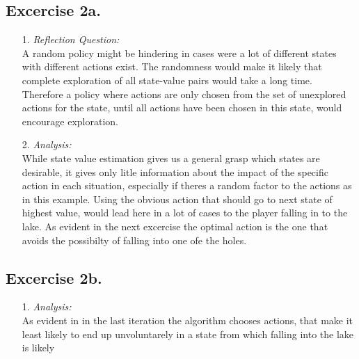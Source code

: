 \documentclass[12pt, a4paper,DIV=12, bibliography=totocnumbered]{scrartcl}
\begin{document}
\subsection{Excercise 2a.}
\begin{itemize}
\item[1.] \textit{Reflection Question:} \\
A random policy might be hindering in cases were a lot of different states with different actions exist. 
The randomness would make it likely that complete exploration of all state-value pairs would take  a long time. 
Therefore a policy where actions are only chosen from the set of unexplored actions for the state, until all actions have been chosen
in this state, would encourage exploration.

\item[2.] \textit{Analysis:} \\
While state value estimation gives us a general grasp which states are desirable, it gives only litle information about the impact of the specific action in each situation, especially if theres a random factor to the actions as in this example.
Using the obvious action that should go to next state of highest value, would lead here in a lot of cases to the player falling in to the lake. As evident in the next excercise the optimal action is the one that avoids the possibilty of falling into one ofe the holes.
\end{itemize}
\subsection{Excercise 2b.}
\begin{itemize}
\item[1.] \textit{Analysis:} \\
As evident in in the last iteration the algorithm chooses  actions, that make it least likely to end up unvoluntarely in a state from which falling into the lake is likely


\end{itemize}
\end{document}
